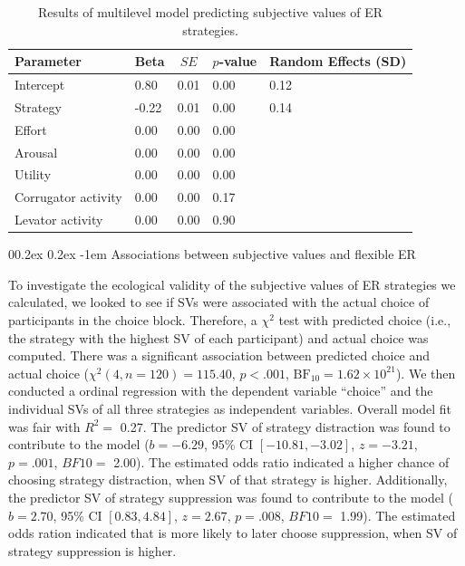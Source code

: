 \documentclass[
  man,floatsintext]{apa6}
\makeatletter
\let\oldparagraph\paragraph
\renewcommand{\paragraph}[1]{\oldparagraph{#1}\mbox{}}
\renewcommand{\paragraph}{\@startsection{paragraph}{4}{\parindent}%
  {0\baselineskip \@plus 0.2ex \@minus 0.2ex}%
  {-1em}%
  {\normalfont\normalsize\bfseries\itshape\typesectitle}}
\makeatother
\begin{document}
\begin{table}[H]

\begin{center}
\begin{threeparttable}

\caption{\label{tab:TabMLM_H5}Results of multilevel model predicting subjective values of ER strategies.}

\begin{tabular}{lllll}
\toprule
Parameter & \multicolumn{1}{c}{Beta} & \multicolumn{1}{c}{$SE$} & \multicolumn{1}{c}{$p$-value} & \multicolumn{1}{c}{Random Effects (SD)}\\
\midrule
Intercept & 0.80 & 0.01 & 0.00 & 0.12\\
Strategy & -0.22 & 0.01 & 0.00 & 0.14\\
Effort & 0.00 & 0.00 & 0.00 & \\
Arousal & 0.00 & 0.00 & 0.00 & \\
Utility & 0.00 & 0.00 & 0.00 & \\
Corrugator activity & 0.00 & 0.00 & 0.17 & \\
Levator activity & 0.00 & 0.00 & 0.90 & \\
\bottomrule
\end{tabular}

\end{threeparttable}
\end{center}

\end{table}

\hypertarget{associations-between-subjective-values-and-flexible-er}{%
\paragraph{Associations between subjective values and flexible ER}\label{associations-between-subjective-values-and-flexible-er}}

To investigate the ecological validity of the subjective values of ER strategies we calculated, we looked to see if SVs were associated with the actual choice of participants in the choice block.
Therefore, a \(\chi^{2}\) test with predicted choice (i.e., the strategy with the highest SV of each participant) and actual choice was computed.
There was a significant association between predicted choice and actual choice (\(\chi^2(4, n = 120) = 115.40\), \(p < .001\), \(\mathrm{BF}_{\textrm{10}} = 1.62 \times 10^{21}\)).
We then conducted a ordinal regression with the dependent variable ``choice'' and the individual SVs of all three strategies as independent variables.
Overall model fit was fair with \(R^{2}=\) 0.27.
The predictor SV of strategy distraction was found to contribute to the model (\(b = -6.29\), 95\% CI \([-10.81, -3.02]\), \(z = -3.21\), \(p = .001\), \(BF10=\) 2.00).
The estimated odds ratio indicated a higher chance of choosing strategy distraction, when SV of that strategy is higher.
Additionally, the predictor SV of strategy suppression was found to contribute to the model (\(b = 2.70\), 95\% CI \([0.83, 4.84]\), \(z = 2.67\), \(p = .008\), \(BF10=\) 1.99).
The estimated odds ration indicated that is more likely to later choose suppression, when SV of strategy suppression is higher.
\end{document}
